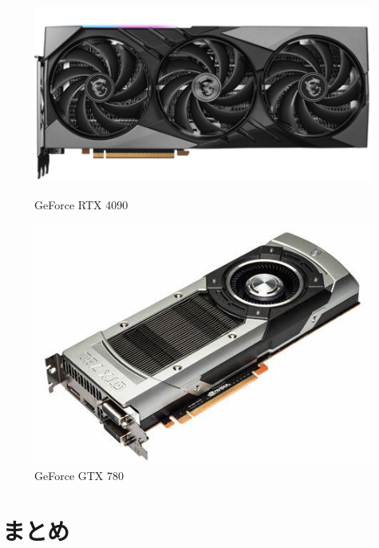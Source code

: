 \documentclass{ltjsarticle} %
\begin{document}
\begin{figure}[H] %
  \centering
  \begin{minipage}{0.45\textwidth} %
    \centering
    \includegraphics[width=\textwidth]{4090.png} %
    \caption{GeForce RTX 4090} %
    \label{fig:4090} %
  \end{minipage}
  \hfill %
  \begin{minipage}{0.45\textwidth} %
    \centering
    \includegraphics[width=\textwidth]{780.jpg} %
    \caption{GeForce GTX 780} %
    \label{fig:780} %
  \end{minipage}
\end{figure}

\section{まとめ}
\end{document}
